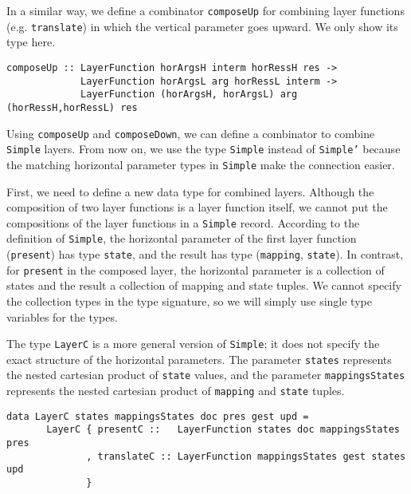 
In a similar way, we define a combinator \texttt{composeUp} for combining layer functions (e.g. \texttt{translate}) in which the vertical parameter goes upward. We only show its type here.

\begin{small}
\begin{verbatim}
composeUp :: LayerFunction horArgsH interm horRessH res ->
             LayerFunction horArgsL arg horRessL interm ->
             LayerFunction (horArgsH, horArgsL) arg (horRessH,horRessL) res
\end{verbatim}
\end{small}


 Using \texttt{composeUp} and \texttt{composeDown}, we can define a combinator to combine \texttt{Simple} layers. From now on, we use the type \texttt{Simple} instead of \texttt{Simple'} because the matching horizontal parameter types in \texttt{Simple} make the connection easier. 

First, we need to define a new data type for combined layers. Although the composition of two layer functions is a layer function itself, we cannot put the compositions of the layer functions in a \texttt{Simple} record. According to the definition of \texttt{Simple}, the horizontal parameter of the first layer function (\texttt{present}) has type \texttt{state}, and the result has type (\texttt{mapping}, \texttt{state}). In contrast, for \texttt{present} in the composed layer, the horizontal parameter is a collection of states and the result a collection of mapping and state tuples. We cannot specify the collection types in the type signature, so we will simply use single type variables for the types.

The type \texttt{LayerC} is a more general version of \texttt{Simple}; it does not specify the exact structure of the horizontal parameters. The parameter \texttt{states} represents the nested cartesian product of \texttt{state} values, and the parameter \texttt{mappingsStates} represents the nested cartesian product of \texttt{mapping} and \texttt{state} tuples.

\begin{small}
\begin{verbatim}
data LayerC states mappingsStates doc pres gest upd =
       LayerC { presentC ::   LayerFunction states doc mappingsStates pres
              , translateC :: LayerFunction mappingsStates gest states upd
              }

\end{verbatim}
\end{small}

